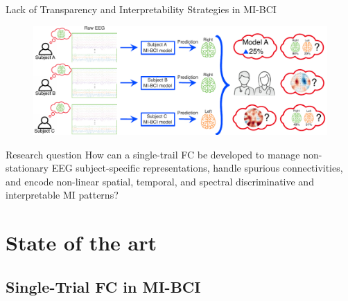 \documentclass[aspectratio=169]{beamer}
\begin{document}
\begin{frame}{Lack of Transparency and Interpretability Strategies in MI-BCI}
    \begin{figure}[!ht]
        \centering
        \includegraphics[width=1\linewidth]{../Tesis_document/Figures/problem_statement/problem3_FV.pdf}
    \end{figure}
\end{frame}


\begin{frame}{Research question}
\centering
How can a single-trail FC be developed to manage non-stationary EEG subject-specific representations, handle spurious connectivities, and encode non-linear spatial, temporal, and spectral discriminative and interpretable MI patterns?
\end{frame}

\section{State of the art}
\subsection{Single-Trial FC in MI-BCI}
\end{document}
